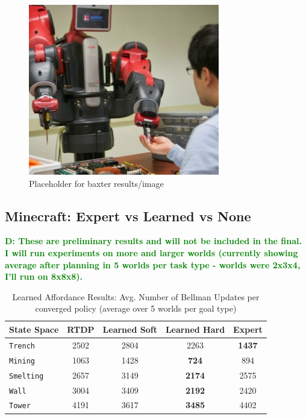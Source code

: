 \documentclass[conference]{IEEEtran}
\newcommand{\dnote}[1]{\textcolor{Green}{\textbf{D: #1}}}
\begin{document}
\begin{figure}[H]
\centering
\includegraphics[scale=0.195]{figures/baxter_temp.jpg}%
  \caption{Placeholder for baxter results/image}
  \label{fig:baxter_results}
\end{figure}

\subsection{Minecraft: Expert vs Learned vs None}

\dnote{These are preliminary results and will not be included in the final. I will run experiments on more and larger worlds (currently showing average after planning in 5 worlds per task type - worlds were 2x3x4, I'll run on 8x8x8).}


\begin{table}[H]
\centering
\begin{tabular}{ l || c c c c }
  State Space & RTDP & Learned Soft & Learned Hard & Expert 	 	\\ \hline
  \texttt{Trench}  	& 	2502	&	2804		&	2263	&	{\bf 1437}	\\
  \texttt{Mining}  	& 	1063	&	1428		&	{\bf 724}	&	894  \\
  \texttt{Smelting}  	& 	2657	&	3149		&	{\bf 2174}	&	2575  \\
  \texttt{Wall}  		& 	3004	&	3409		&	{\bf 2192}	&	2420\\
  \texttt{Tower}  		& 	4191	&	3617		&	{\bf 3485}	&	4402 \\
\end{tabular}
\caption{Learned Affordance Results: Avg. Number of Bellman Updates per converged policy (average over 5 worlds per goal type)}
\label{table:minecraft_results_bellman}
\end{table}
\end{document}
